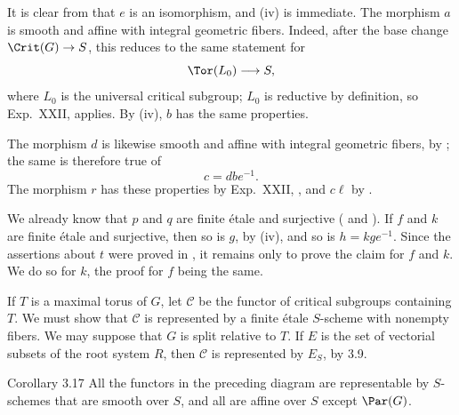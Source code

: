 \SGAProof
It is clear from  that \(e\) is an isomorphism, and (iv) is
immediate.  The morphism \(a\) is smooth and affine with integral
geometric fibers.  Indeed, after the base change \(\Crit(G)\to S\), this
reduces to the same statement for
\[
 \Tor(L_0)\longrightarrow S,
\]
where \(L_0\) is the universal critical subgroup; \(L_0\) is reductive by
definition, so Exp.\ XXII,  applies.  By (iv), \(b\) has the same
properties.

The morphism \(d\) is likewise smooth and affine with integral geometric
fibers, by ; the same is therefore true of
\[
 c=dbe^{-1}.
\]
The morphism \(r\) has these properties by Exp.\ XXII, , and
\(c\ell\) by .

We already know that \(p\) and \(q\) are finite étale and surjective
( and ).  If \(f\) and \(k\) are finite étale and surjective, then
so is \(g\), by (iv), and so is \(h=kge^{-1}\).  Since the assertions
about \(t\) were proved in , it remains only to prove the claim for
\(f\) and \(k\).  We do so for \(k\), the proof for \(f\) being the same.

If \(T\) is a maximal torus of \(G\), let \(\mathcal C\) be the functor of
critical subgroups containing \(T\).  We must show that \(\mathcal C\) is
represented by a finite étale \(S\)-scheme with nonempty fibers.  We may
suppose that \(G\) is split relative to \(T\).  If \(E\) is the set of
vectorial subsets of the root system \(R\), then \(\mathcal C\) is
represented by \(E_S\), by 3.9.
\SGAQED

\begin{sgastatement}{Corollary 3.17}
All the functors in the preceding diagram are representable by
\(S\)-schemes that are smooth over \(S\), and all are affine over \(S\)
except \(\Par(G)\).
\end{sgastatement}

